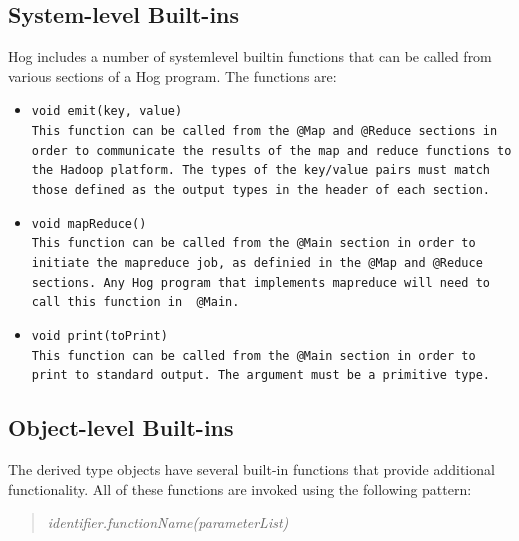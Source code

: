 \documentclass{book}
\begin{document}
\subsection{System-level Built-ins} %
\label{sub:system_level_built_ins}

Hog includes a number of system­level built­in functions that can be called from
various sections of a Hog program. The functions are:

\begin{itemize} 

\item[] \tt void emit(key, value) \rm \\

This function can be called from the \tt @Map \rm and \tt @Reduce \rm sections in
order to communicate the results of the map and reduce functions to the Hadoop
platform. The types of the key/value pairs must match those defined as the output
types in the header of each section.

\item[] \tt void mapReduce() \rm \\

This function can be called from the \tt @Main \rm section in order to initiate
the mapreduce job, as definied in the \tt @Map \rm and \tt @Reduce \rm sections.
Any Hog program that implements mapreduce will need to call this function in \tt
@Main\rm.

\item[] \tt void print(toPrint) \rm \\

This function can be called from the \tt @Main \rm section in order to print to
standard output. The argument must be a primitive type.

\end{itemize}


\subsection{Object-level Built-ins} %
\label{sub:object_level_built_ins}

The derived type objects have several built-in functions that provide
additional functionality. All of these functions are invoked using the
following pattern:

\begin{quotation}
\emph{identifier.functionName(parameterList)}
\end{quotation}
\end{document}

